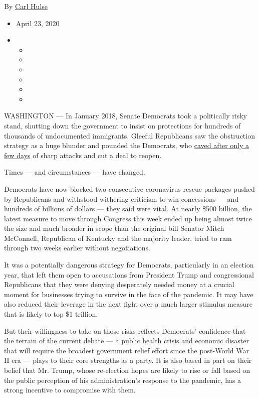 By \href{https://www.nytimes.com/by/carl-hulse}{Carl Hulse}

\begin{itemize}
\item
  April 23, 2020
\item
  \begin{itemize}
  \item
  \item
  \item
  \item
  \item
  \item
  \end{itemize}
\end{itemize}

WASHINGTON --- In January 2018, Senate Democrats took a politically
risky stand, shutting down the government to insist on protections for
hundreds of thousands of undocumented immigrants. Gleeful Republicans
saw the obstruction strategy as a huge blunder and pounded the
Democrats, who
\href{https://www.nytimes.com/2018/01/22/us/politics/congress-votes-to-end-government-shutdown.html}{caved
after only a few days} of sharp attacks and cut a deal to reopen.

Times --- and circumstances --- have changed.

Democrats have now blocked two consecutive coronavirus rescue packages
pushed by Republicans and withstood withering criticism to win
concessions --- and hundreds of billions of dollars --- they said were
vital. At nearly \$500 billion, the latest measure to move through
Congress this week ended up being almost twice the size and much broader
in scope than the original bill Senator Mitch McConnell, Republican of
Kentucky and the majority leader, tried to ram through two weeks earlier
without negotiations.

It was a potentially dangerous strategy for Democrats, particularly in
an election year, that left them open to accusations from President
Trump and congressional Republicans that they were denying desperately
needed money at a crucial moment for businesses trying to survive in the
face of the pandemic. It may have also reduced their leverage in the
next fight over a much larger stimulus measure that is likely to top \$1
trillion.

But their willingness to take on those risks reflects Democrats'
confidence that the terrain of the current debate --- a public health
crisis and economic disaster that will require the broadest government
relief effort since the post-World War II era --- plays to their core
strengths as a party. It is also based in part on their belief that Mr.
Trump, whose re-election hopes are likely to rise or fall based on the
public perception of his administration's response to the pandemic, has
a strong incentive to compromise with them.

